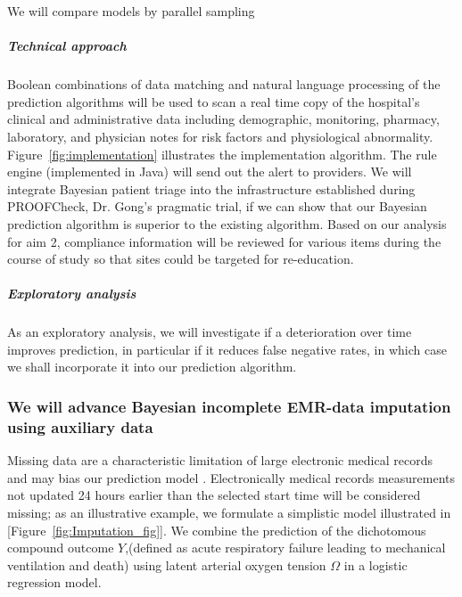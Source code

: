 \documentclass[11pt,notitlepage]{article}
\begin{document}
We will compare models by parallel sampling \cite{Congdon_modelcomparison_2005}

\subparagraph*{Technical approach}
Boolean combinations of data matching and natural language processing of the prediction algorithms will be used to scan a real time copy of the hospital's clinical and administrative data including demographic, monitoring, pharmacy, laboratory, and physician notes for risk factors and physiological abnormality. Figure~\ref{fig:implementation} illustrates the implementation algorithm. The rule engine (implemented in Java) will send out the alert to providers.
We will integrate Bayesian patient triage into the infrastructure established during PROOFCheck, Dr. Gong's pragmatic trial, if we can show that our Bayesian prediction algorithm is superior to the existing algorithm. Based on our analysis for aim 2, compliance information will be reviewed for various items during the course of study so that sites could be targeted for re-education.

\subparagraph{Exploratory analysis}
As an exploratory analysis, we will investigate if a deterioration over time improves prediction, in particular if it reduces false negative rates, in which case we shall incorporate it into our prediction algorithm.

\subsubsection*{We will advance Bayesian incomplete EMR-data imputation using auxiliary data}
Missing data are a characteristic limitation of large electronic medical records and may bias our prediction model \cite{Dean_19279318}. Electronically medical records measurements not updated 24 hours earlier than the selected start time will be considered missing;  as an illustrative example, we formulate a simplistic model illustrated in [Figure~\ref{fig:Imputation_fig}]. We combine the prediction of the dichotomous compound outcome $Y$,(defined as acute respiratory failure leading to mechanical ventilation and death) using latent arterial oxygen tension $\Omega$ in a logistic regression model. 
\end{document}
